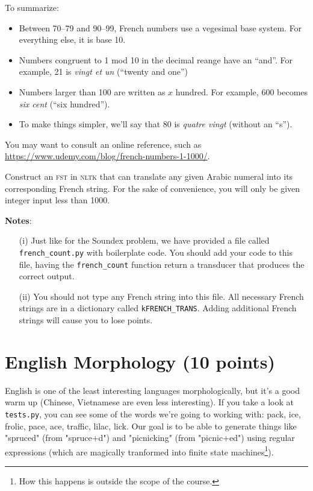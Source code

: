 \documentclass[11pt]{article}
\begin{document}
\noindent To summarize:
\begin{itemize}
\item Between 70--79 and 90--99, French numbers use a
vegesimal base system.  For everything else, it is base 10.
\item Numbers congruent to 1 mod 10 in the decimal reange have an ``and''.  For example, 21
  is \textit{vingt et un} (``twenty and one'')
\item Numbers larger than 100 are written as $x$ hundred.  For
  example, 600 becomes \textit{six cent} (``six hundred'').
\item To make things simpler, we'll say that 80 is \textit{quatre vingt} (without an ``s'').
\end{itemize}

You may want to consult an online reference, such
as \url{https://www.udemy.com/blog/french-numbers-1-1000/}.

Construct an \textsc{fst} in \textsc{nltk} that can translate any
given Arabic numeral into its corresponding French string. For the
sake of convenience, you will only be given integer input less than
1000.


\noindent \textbf{Notes}:
\begin{itemize}
	\item[(i)]  Just like for the Soundex problem, we have provided a file
          called \texttt{french\_count.py} with boilerplate code. You
          should add your code to this file, having the
          \texttt{french\_count} function return a transducer that
          produces the correct output.
	\item[(ii)] You should not type any French string into this
          file.  All necessary French strings are in a dictionary
          called \texttt{kFRENCH\_TRANS}.  Adding additional French
          strings will cause you to lose points.
\end{itemize}

\section*{English Morphology (10 points)}

English is one of the least interesting languages morphologically, but
it's a good warm up (Chinese, Vietnamese are even less
interesting). If you take a look at \texttt{tests.py}, you can see
some of the words we're going to working with: pack, ice, frolic,
pace, ace, traffic, lilac, lick.  Our goal is to be able to generate
things like "spruced" (from "spruce+d") and "picnicking" (from
"picnic+ed") using regular expressions (which are magically tranformed
into finite state machines\footnote{How this happens is outside the
  scope of the course.}).
\end{document}
